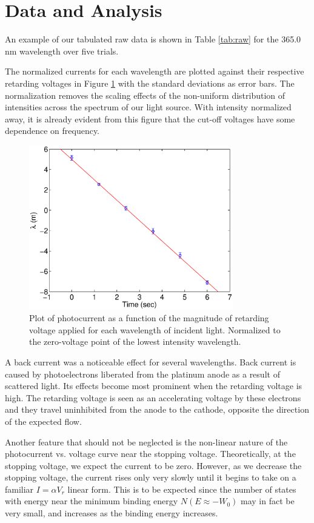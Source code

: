 \documentclass[aps,twocolumn,secnumarabic,nobalancelastpage,amsmath,amssymb,
nofootinbib]{revtex4}
\begin{document}
\section{Data and Analysis}

An example of our tabulated raw data is shown in Table \ref{tab:raw} for the 365.0 nm wavelength over five trials.  




The normalized currents for each wavelength are plotted against their respective retarding voltages in Figure \ref{fig:normcurrent} with the standard deviations as error bars.  The normalization removes the scaling effects of the non-uniform distribution of intensities across the spectrum of our light source.  With intensity normalized away, it is already evident from this figure that the cut-off voltages have some dependence on frequency.

\begin{figure}[htbp]
\includegraphics[width=3.5in]{graph_norm}
\caption{\label{fig:normcurrent}Plot of photocurrent as a function of the magnitude of retarding voltage applied for each wavelength of incident light.  Normalized to the zero-voltage point of the lowest intensity wavelength.}
\end{figure}

A back current was a noticeable effect for several wavelengths.  Back current is caused by photoelectrons liberated from the platinum anode as a result of scattered light.  Its effects become most prominent when the retarding voltage is high.  The retarding voltage is seen as an accelerating voltage by these electrons and they travel uninhibited from the anode to the cathode, opposite the direction of the expected flow. 

Another feature that should not be neglected is the non-linear nature of the photocurrent vs. voltage curve near the stopping voltage.  Theoretically, at the stopping voltage, we expect the current to be zero.  However, as we decrease the stopping voltage, the current rises only very slowly until it begins to take on a familiar $I = \alpha V_r$ linear form.  This is to be expected since the number of states with energy near the minimum binding energy $N(E\approx-W_0)$ may in fact be very small, and increases as the binding energy increases.
\end{document}
